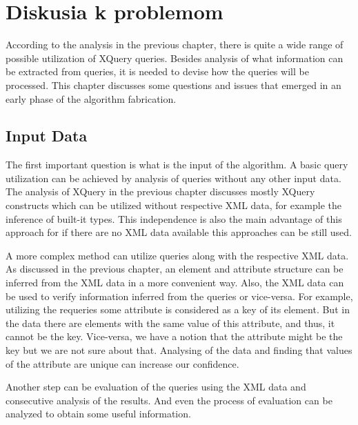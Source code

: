 \chapter{Diskusia k problemom}
According to the analysis in the previous chapter, there is quite a wide range of possible utilization of XQuery queries. Besides analysis of what information can be extracted from queries, it is needed to devise how the queries will be processed. This chapter discusses some questions and issues that emerged in an early phase of the algorithm fabrication.

\section{Input Data}
The first important question is what is the input of the algorithm. A basic query utilization can be achieved by analysis of queries without any other input data. The analysis of XQuery in the previous chapter discusses mostly XQuery constructs which can be utilized without respective XML data, for example the inference of built-it types. This independence is also the main advantage of this approach for if there are no XML data available this approaches can be still used. 

A more complex method can utilize queries along with the respective XML data. As discussed in the previous chapter, an element and attribute structure can be inferred from the XML data in a more convenient way. Also, the XML data can be used to verify information inferred from the queries or vice-versa. For example, utilizing the requeries some attribute is considered as a key of its element. But in the data there are elements with the same value of this attribute, and thus, it cannot be the key. Vice-versa, we have a notion that the attribute might be the key but we are not sure about that. Analysing of the data and finding that values of the attribute are unique can increase our confidence. 

Another step can be evaluation of the queries using the XML data and consecutive analysis of the results. And even the process of evaluation can be analyzed to obtain some useful information. 


